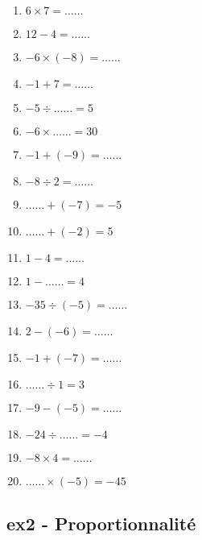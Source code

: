 \documentclass[12pt]{article}
\begin{document}
\begin{multicols}{3}\noindent

    \begin{enumerate}
    \item $6 \times 7 = \ldots\ldots$
    \item $12 - 4 = \ldots\ldots$
    \item $-6 \times \left( -8\right) = \ldots\ldots$
    \item $-1 + 7 = \ldots\ldots$
    \item $-5 \div \ldots\ldots = 5$
    \item $-6 \times \ldots\ldots = 30$
    \item $-1 + \left( -9\right) = \ldots\ldots$
    \item $-8 \div 2 = \ldots\ldots$
    \item $\ldots\ldots + \left( -7\right) = -5$
    \item $\ldots\ldots + \left( -2\right) = 5$
    \item $1 - 4 = \ldots\ldots$
    \item $1 - \ldots\ldots = 4$
    \item $-35 \div \left( -5\right) = \ldots\ldots$
    \item $2 - \left( -6\right) = \ldots\ldots$
    \item $-1 + \left( -7\right) = \ldots\ldots$
    \item $\ldots\ldots \div 1 = 3$
    \item $-9 - \left( -5\right) = \ldots\ldots$
    \item $-24 \div \ldots\ldots = -4$
    \item $-8 \times 4 = \ldots\ldots$
    \item $\ldots\ldots \times \left( -5\right) = -45$
    \end{enumerate}
  
\end{multicols}

\subsection*{ex2 - Proportionnalité}
\end{document}
